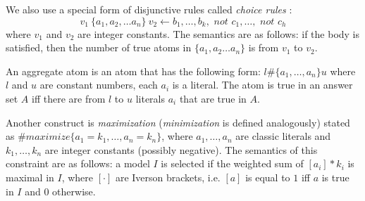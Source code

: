 We also use a special form of disjunctive rules called \textit{choice rules} \cite{aspbook}:
\begin{equation*}
  v_1~\{ a_1, a_2, \dots a_n \}~v_2 \leftarrow b_1, \dots, b_k, \textit{ not }c_1,\dots,\textit{ not }c_h
\end{equation*}
where $v_1$ and $v_2$ are integer constants. The semantics are as follows: if the body is satisfied, then the number of true atoms in $\{ a_1, a_2 \dots a_n \}$ is from $v_1$ to $v_2$.

An aggregate atom is an atom that has the following form: $l \# \{ a_1, \dots ,a_n \} u$
where $l$ and $u$ are constant numbers, each $a_i$ is a literal. The atom is true in an answer set $A$ iff there are from $l$ to $u$ literals $a_i$ that are true in $A$.

Another construct is \textit{maximization} \parencite{aspbook, leone} (\textit{minimization} is defined analogously) stated as $\#maximize\{ a_1=k_1, \dots, a_n=k_n \}$, 
where $a_1, \dots, a_n$ are classic literals and $k_1, \dots, k_n$ are integer constants (possibly negative). The semantics of this constraint are as follows: a model $I$ is selected if the weighted sum of $[a_i]*k_i$ is maximal in $I$, where $[\cdot]$ are Iverson brackets, i.e. $[a]$ is equal to $1$ iff $a$ is true in $I$ and $0$ otherwise.










